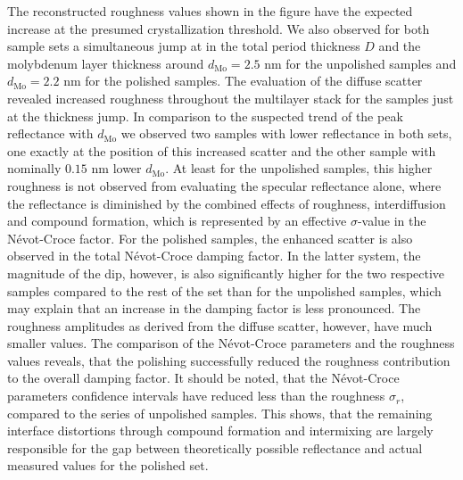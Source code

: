 The reconstructed roughness values shown in the figure have the expected increase at the presumed crystallization threshold. We also observed for both sample sets a simultaneous jump at in the total period thickness $D$ and the molybdenum layer thickness around $d_\text{Mo} = 2.5$ nm for the unpolished samples and $d_\text{Mo} = 2.2$ nm for the polished samples. The evaluation of the diffuse scatter revealed increased roughness throughout the multilayer stack for the samples just at the thickness jump. In comparison to the suspected trend of the peak reflectance with $d_\text{Mo}$ we observed two samples with lower reflectance in both sets, one exactly at the position of this increased scatter and the other sample with nominally $0.15$ nm lower $d_\text{Mo}$. At least for the unpolished samples, this higher roughness is not observed from evaluating the specular reflectance alone, where the reflectance is diminished by the combined effects of roughness, interdiffusion and compound formation, which is represented by an effective $\sigma$-value in the N\'{e}vot-Croce factor. For the polished samples, the enhanced scatter is also observed in the total N\'{e}vot-Croce damping factor. In the latter system, the magnitude of the dip, however, is also significantly higher for the two respective samples compared to the rest of the set than for the unpolished samples, which may explain that an increase in the damping factor is less pronounced. The roughness amplitudes as derived from the diffuse scatter, however, have much smaller values. The comparison of the N\'{e}vot-Croce parameters and the roughness values reveals, that the polishing successfully reduced the roughness contribution to the overall damping factor. It should be noted, that the N\'{e}vot-Croce parameters confidence intervals have reduced less than the roughness $\sigma_r$, compared to the series of unpolished samples. This shows, that the remaining interface distortions through compound formation and intermixing are largely responsible for the gap between theoretically possible reflectance and actual measured values for the polished set.

